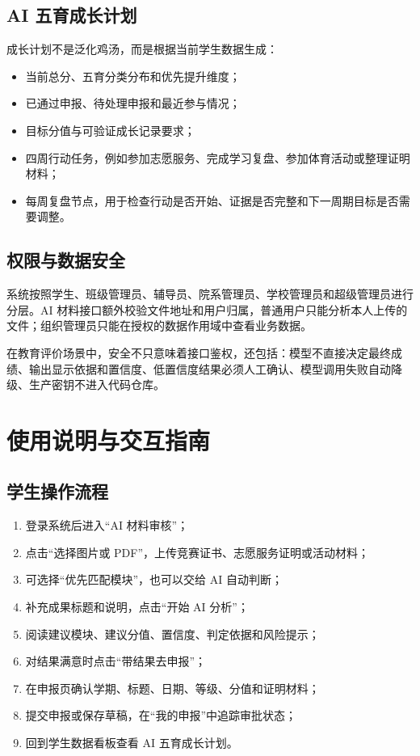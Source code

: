 \documentclass[UTF8,a4paper,11pt]{ctexart}
\begin{document}
\subsection{AI 五育成长计划}

成长计划不是泛化鸡汤，而是根据当前学生数据生成：
\begin{itemize}
  \item 当前总分、五育分类分布和优先提升维度；
  \item 已通过申报、待处理申报和最近参与情况；
  \item 目标分值与可验证成长记录要求；
  \item 四周行动任务，例如参加志愿服务、完成学习复盘、参加体育活动或整理证明材料；
  \item 每周复盘节点，用于检查行动是否开始、证据是否完整和下一周期目标是否需要调整。
\end{itemize}

\subsection{权限与数据安全}

系统按照学生、班级管理员、辅导员、院系管理员、学校管理员和超级管理员进行分层。AI 材料接口额外校验文件地址和用户归属，普通用户只能分析本人上传的文件；组织管理员只能在授权的数据作用域中查看业务数据。

在教育评价场景中，安全不只意味着接口鉴权，还包括：模型不直接决定最终成绩、输出显示依据和置信度、低置信度结果必须人工确认、模型调用失败自动降级、生产密钥不进入代码仓库。

\newpage
\section{使用说明与交互指南}

\subsection{学生操作流程}

\begin{enumerate}
  \item 登录系统后进入“AI 材料审核”；
  \item 点击“选择图片或 PDF”，上传竞赛证书、志愿服务证明或活动材料；
  \item 可选择“优先匹配模块”，也可以交给 AI 自动判断；
  \item 补充成果标题和说明，点击“开始 AI 分析”；
  \item 阅读建议模块、建议分值、置信度、判定依据和风险提示；
  \item 对结果满意时点击“带结果去申报”；
  \item 在申报页确认学期、标题、日期、等级、分值和证明材料；
  \item 提交申报或保存草稿，在“我的申报”中追踪审批状态；
  \item 回到学生数据看板查看 AI 五育成长计划。
\end{enumerate}
\end{document}
